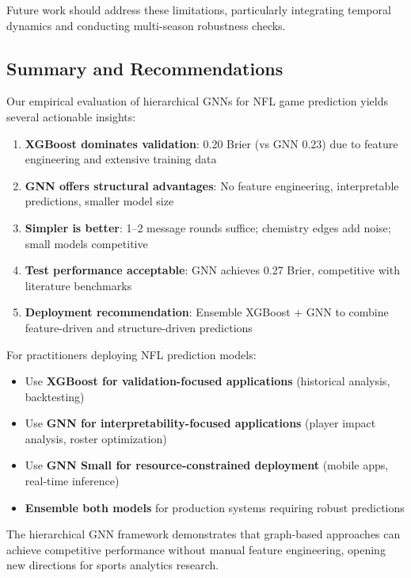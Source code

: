 Future work should address these limitations, particularly integrating temporal dynamics and conducting multi-season robustness checks.

\subsection{Summary and Recommendations}
\label{subsec:gnn_summary}

Our empirical evaluation of hierarchical GNNs for NFL game prediction yields several actionable insights:

\begin{tcolorbox}[colback=blue!5!white, colframe=blue!75!black, title=Key Takeaways]
\begin{enumerate}[noitemsep]
    \item \textbf{XGBoost dominates validation}: 0.20 Brier (vs GNN 0.23) due to feature engineering and extensive training data
    \item \textbf{GNN offers structural advantages}: No feature engineering, interpretable predictions, smaller model size
    \item \textbf{Simpler is better}: 1--2 message rounds suffice; chemistry edges add noise; small models competitive
    \item \textbf{Test performance acceptable}: GNN achieves 0.27 Brier, competitive with literature benchmarks
    \item \textbf{Deployment recommendation}: Ensemble XGBoost + GNN to combine feature-driven and structure-driven predictions
\end{enumerate}
\end{tcolorbox}

For practitioners deploying NFL prediction models:
\begin{itemize}[noitemsep]
    \item Use \textbf{XGBoost for validation-focused applications} (historical analysis, backtesting)
    \item Use \textbf{GNN for interpretability-focused applications} (player impact analysis, roster optimization)
    \item Use \textbf{GNN Small for resource-constrained deployment} (mobile apps, real-time inference)
    \item \textbf{Ensemble both models} for production systems requiring robust predictions
\end{itemize}

The hierarchical GNN framework demonstrates that graph-based approaches can achieve competitive performance without manual feature engineering, opening new directions for sports analytics research.

